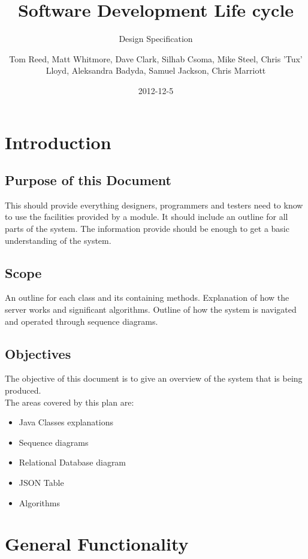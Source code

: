\documentclass{project}
\begin{document}
\title{Software Development Life cycle}
\subtitle{Design Specification}
\author{Tom Reed, Matt Whitmore, Dave Clark, Silhab Csoma, Mike Steel, Chris 'Tux' Lloyd, Aleksandra Badyda, Samuel Jackson, Chris Marriott}
\date{2012-12-5}
\maketitle
\tableofcontents
\newpage
\section{Introduction}
\subsection{Purpose of this Document}
This should provide everything designers, programmers and testers need to know to use the facilities
provided by a module. It should include an outline for all parts of the system. The information provide should be enough to get a basic understanding of the system.

\subsection{Scope}
An outline for each class and its containing methods. Explanation of how the server works and significant algorithms. Outline of how the system is navigated and operated through sequence diagrams.

\subsection{Objectives}
The objective of this document is to give an overview of the system that is being produced.
\\
The areas covered by this plan are:
\begin{itemize}
	\item Java Classes explanations
	\item Sequence diagrams
	\item Relational Database diagram
	\item JSON Table
	\item Algorithms
\end{itemize}

\section{General Functionality}
\end{document}
